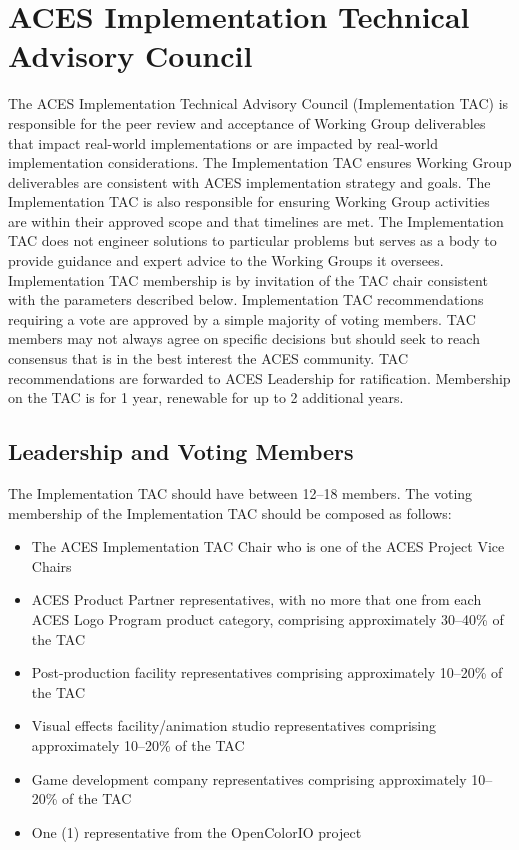 \newpage
\section{ACES Implementation Technical Advisory Council}
The ACES Implementation Technical Advisory Council (Implementation TAC) is responsible for the peer review and acceptance of Working Group deliverables that impact real-world implementations or are impacted by real-world implementation considerations. The Implementation TAC ensures Working Group deliverables are consistent with ACES implementation strategy and goals. The Implementation TAC is also responsible for ensuring Working Group activities are within their approved scope and that timelines are met. The Implementation TAC does not engineer solutions to particular problems but serves as a body to provide guidance and expert advice to the Working Groups it oversees. Implementation TAC membership is by invitation of the TAC chair consistent with the parameters described below. Implementation TAC recommendations requiring a vote are approved by a simple majority of voting members. TAC members may not always agree on specific decisions but should seek to reach consensus that is in the best interest the ACES community.  TAC recommendations are forwarded to ACES Leadership for ratification.  Membership on the TAC is for 1 year, renewable for up to 2 additional years.

\subsection{Leadership and Voting Members}
The Implementation TAC should have between 12--18 members.  The voting membership of the Implementation TAC should be composed as follows:

\begin{itemize}
    \item The ACES Implementation TAC Chair who is one of the ACES Project Vice Chairs
    \item ACES Product Partner representatives, with no more that one from each ACES Logo Program product category, comprising approximately 30--40\% of the TAC
    \item Post-production facility representatives comprising approximately 10--20\% of the TAC
    \item Visual effects facility/animation studio representatives comprising approximately 10--20\% of the TAC
    \item Game development company representatives comprising approximately 10--20\% of the TAC
    \item One (1) representative from the OpenColorIO project
\end{itemize}

